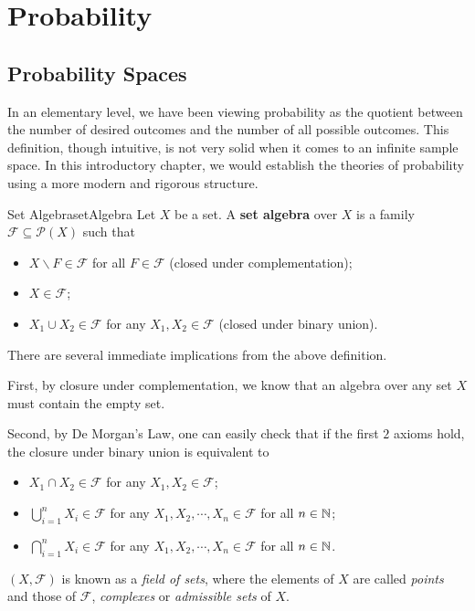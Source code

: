 \documentclass[math, code]{amznotes}
\theoremstyle{remark}
\begin{document}
\tableofcontents

\chapter{Probability}
\section{Probability Spaces}
In an elementary level, we have been viewing probability as the quotient between the number of desired outcomes and the number of all possible outcomes. This definition, though intuitive, is not very solid when it comes to an infinite sample space. In this introductory chapter, we would establish the theories of probability using a more modern and rigorous structure.
\begin{dfnbox}{Set Algebra}{setAlgebra}
    Let $X$ be a set. A {\color{red} \textbf{set algebra}} over $X$ is a family $\mathcal{F} \subseteq \mathcal{P}\left(X\right)$ such that 
    \begin{itemize}
        \item $X \backslash F \in \mathcal{F}$ for all $F \in \mathcal{F}$ (closed under complementation);
        \item $X \in \mathcal{F}$;
        \item $X_1 \cup X_2 \in \mathcal{F}$ for any $X_1, X_2 \in \mathcal{F}$ (closed under binary union).
    \end{itemize}
\end{dfnbox}
There are several immediate implications from the above definition. 

First, by closure under complementation, we know that an algebra over any set $X$ must contain the empty set. 

Second, by De Morgan's Law, one can easily check that if the first $2$ axioms hold, the closure under binary union is equivalent to 
\begin{itemize}
    \item $X_1 \cap X_2 \in \mathcal{F}$ for any $X_1, X_2 \in \mathcal{F}$;
    \item $\bigcup_{i = 1}^{n}X_i \in \mathcal{F}$ for any $X_1, X_2, \cdots, X_n \in \mathcal{F}$ for all $n \in \mathbb{N}$;
    \item $\bigcap_{i = 1}^{n}X_i \in \mathcal{F}$ for any $X_1, X_2, \cdots, X_n \in \mathcal{F}$ for all $n \in \mathbb{N}$.
\end{itemize}
$\left(X, \mathcal{F}\right)$ is known as a \textit{field of sets}, where the elements of $X$ are called \textit{points} and those of $\mathcal{F}$, \textit{complexes} or \textit{admissible sets} of $X$.
\end{document}
